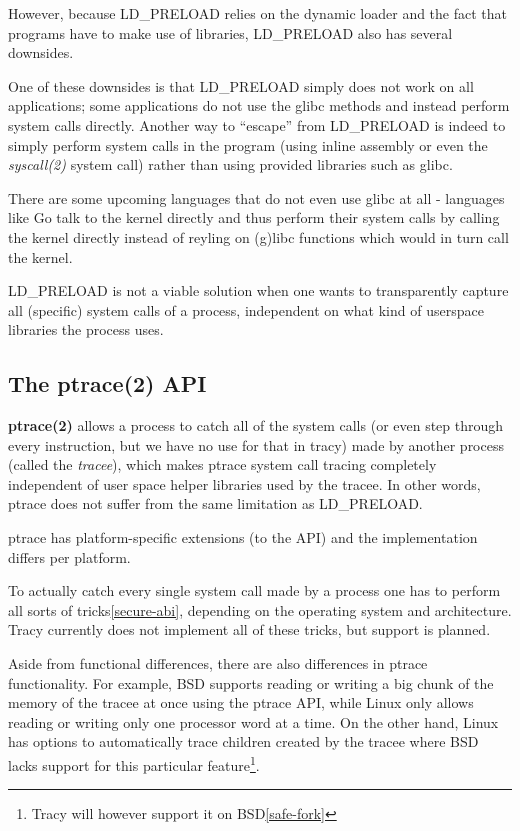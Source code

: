 \documentclass[a4paper, 10pt]{report}
\begin{document}
However, because LD\_PRELOAD relies on the dynamic loader and the fact that
programs have to make use of libraries, LD\_PRELOAD also has several downsides.

One of these downsides is that LD\_PRELOAD simply does not work on all
applications; some applications do not use the glibc methods and instead
perform system calls directly. Another way to ``escape'' from LD\_PRELOAD
is indeed to simply perform system calls in the program (using inline assembly
or even the \textit{syscall(2)} system call) rather than using
provided libraries such as glibc.

There are some upcoming languages that do not even use glibc at all - languages
like Go \cite{golang} talk to the kernel directly and thus perform their
system calls by calling the kernel directly instead of
reyling on (g)libc functions which would in turn call the kernel.

LD\_PRELOAD is not a viable solution when one wants to transparently capture
all (specific) system calls of a process, independent on what kind of
userspace libraries the process uses.

\subsection{The ptrace(2) API}

\textbf{ptrace(2)} allows a process to catch all of the system calls (or even
step through every instruction, but we have no use for that in tracy)
made by another process (called the \textit{tracee}), which makes ptrace system
call tracing completely independent of user space helper libraries used by the
tracee. In other words, ptrace does not suffer from the same limitation as
LD\_PRELOAD.

ptrace has platform-specific extensions (to the API) and the
implementation differs per platform.

To actually catch every single system call made by a process one has to
perform all sorts of tricks\ref{secure-abi}, depending on the operating system and
architecture. Tracy currently does not implement all of these tricks, but
support is planned.

Aside from functional differences, there are also differences in ptrace
functionality.
For example, BSD supports reading or writing a big chunk of the memory
of the tracee at once using the ptrace API, while Linux only allows
reading or writing only one processor word at a time.
On the other hand, Linux has options to automatically trace
children created by the tracee where BSD lacks support for
this particular feature\footnote{Tracy will however support it on
BSD\ref{safe-fork}}.
\end{document}
